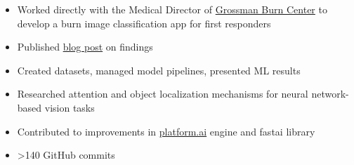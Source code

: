 \documentclass[10pt,a4paper]{altacv}
\begin{document}

\begin{fullwidth}
\makecvheader
\end{fullwidth}




\begin{itemize}
\item Worked directly with the Medical Director of 
\href{https://www.grossmanburncenter.com/}{Grossman Burn Center} to develop a burn image classification app for first responders
\item Published \href{https://platform.ai/blog/page/6/classifying-burn-depth/}{blog post} on findings
\item Created datasets, managed model pipelines, presented ML results
\item Researched attention and object localization mechanisms for neural network-based vision tasks 
\item Contributed to improvements in 
\href{https://platform.ai/}{platform.ai} engine and fastai library
\item >140 GitHub commits
\end{itemize}
\end{document}
